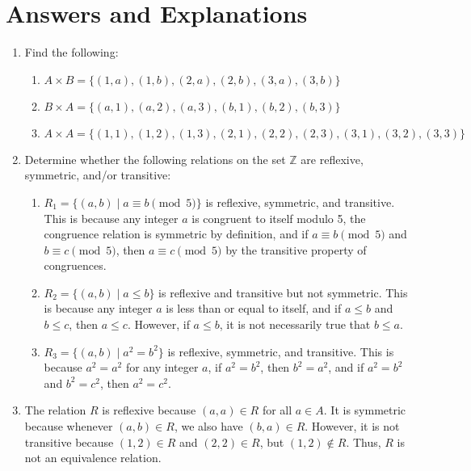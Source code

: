 \section*{Answers and Explanations}

\begin{enumerate}
\item
Find the following:

\begin{enumerate}
    \item $A \times B = \{(1, a), (1, b), (2, a), (2, b), (3, a), (3, b)\}$
    \item $B \times A = \{(a, 1), (a, 2), (a, 3), (b, 1), (b, 2), (b, 3)\}$
    \item $A \times A = \{(1, 1), (1, 2), (1, 3), (2, 1), (2, 2), (2, 3), (3, 1), (3, 2), (3, 3)\}$
\end{enumerate}

\item
Determine whether the following relations on the set $\mathbb{Z}$ are reflexive, symmetric, and/or transitive:

\begin{enumerate}
    \item $R_1 = \{(a, b) \mid a \equiv b \pmod{5}\}$ is reflexive, symmetric, and transitive. This is because any integer $a$ is congruent to itself modulo 5, the congruence relation is symmetric by definition, and if $a \equiv b \pmod{5}$ and $b \equiv c \pmod{5}$, then $a \equiv c \pmod{5}$ by the transitive property of congruences.
    \item $R_2 = \{(a, b) \mid a \leq b\}$ is reflexive and transitive but not symmetric. This is because any integer $a$ is less than or equal to itself, and if $a \leq b$ and $b \leq c$, then $a \leq c$. However, if $a \leq b$, it is not necessarily true that $b \leq a$.
    \item $R_3 = \{(a, b) \mid a^2 = b^2\}$ is reflexive, symmetric, and transitive. This is because $a^2 = a^2$ for any integer $a$, if $a^2 = b^2$, then $b^2 = a^2$, and if $a^2 = b^2$ and $b^2 = c^2$, then $a^2 = c^2$.
\end{enumerate}

\item
The relation $R$ is reflexive because $(a, a) \in R$ for all $a \in A$. It is symmetric because whenever $(a, b) \in R$, we also have $(b, a) \in R$. However, it is not transitive because $(1, 2) \in R$ and $(2, 2) \in R$, but $(1, 2) \notin R$. Thus, $R$ is not an equivalence relation.


\end{enumerate}
